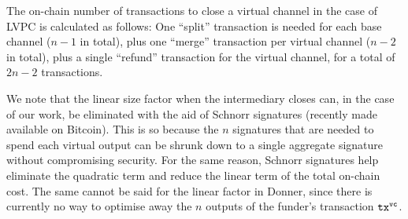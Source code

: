   The on-chain number of transactions to close a virtual channel in the case of
  LVPC is calculated as follows: One ``split'' transaction is needed for each
  base channel ($n-1$ in total), plus one ``merge'' transaction per virtual
  channel ($n-2$ in total), plus a single ``refund'' transaction for the virtual
  channel, for a total of $2n-2$ transactions.

  We note that the linear size factor when the intermediary closes can, in the
  case of our work, be eliminated with the aid of Schnorr signatures (recently
  made available on Bitcoin). This is so because the $n$ signatures that are
  needed to spend each virtual output can be shrunk down to a single aggregate
  signature without compromising security. For the same reason, Schnorr
  signatures help eliminate the quadratic term and reduce the linear term of the
  total on-chain cost. The same cannot be said for the linear factor in Donner,
  since there is currently no way to optimise away the $n$ outputs of the
  funder's transaction $\texttt{tx}^{\mathtt{vc}}$.
